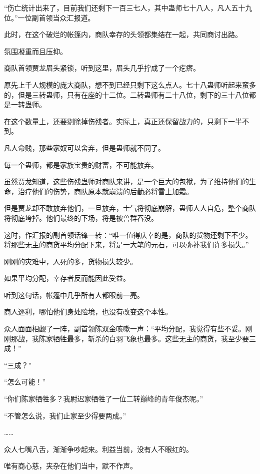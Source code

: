 
\begin{this_body}

“伤亡统计出来了，目前我们还剩下一百三七人，其中蛊师七十八人，凡人五十九位。”一位副首领当众汇报道。

此时，在这个破烂的帐篷内，商队幸存的头领都集结在一起，共同商讨出路。

氛围凝重而且压抑。

商队首领贾龙眉头紧锁，听到这里，眉头几乎拧成了一个疙瘩。

原先上千人规模的庞大商队，想不到已经只剩下这么点人。七十八蛊师听起来蛮多的，但是三转蛊师，只有在座的十二位。二转蛊师有二十八位，剩下的三十八位都是一转蛊师。

在这个数量上，还要剔除掉伤残者。实际上，真正还保留战力的，只剩下一半不到。

凡人命贱，那些家奴可以舍弃，但是蛊师就不同了。

每一个蛊师，都是家族宝贵的财富，不可能放弃。

虽然贾龙知道，这些伤残蛊师对商队来讲，是一个巨大的包袱，为了维持他们的生命，治疗他们的伤势，商队原本就崩溃的后勤必将雪上加霜。

但是贾龙却不敢放弃他们，一旦放弃，士气将彻底崩解，蛊师人人自危，整个商队将彻底垮掉。他们最终的下场，将是被兽群吞没。

这时，作汇报的副首领话锋一转：“唯一值得庆幸的是，商队的货物还剩下不少。将那些无主的商货平均分配下来，将是一大笔的元石，可以弥补我们许多损失。”

刚刚的灾难中，人死的多，货物损失较少。

如果平均分配，幸存者反而能因此受益。

听到这句话，帐篷中几乎所有人都眼前一亮。

商人逐利，哪怕他们身处险境，也没有改变这个本性。

众人面面相觑了一阵，副首领陈双金咳嗽一声：“平均分配，我觉得有些不妥。刚刚那战，我陈家牺牲最多，斩杀的白羽飞象也最多。这些无主的商货，我至少要三成！”

“三成？”

“怎么可能！”

“你们陈家牺牲多？我尉迟家牺牲了一位二转巅峰的青年俊杰呢。”

“不管怎么说，我们止家至少得要两成。”

……

众人七嘴八舌，渐渐争吵起来。利益当前，没有人不眼红的。

唯有商心慈，夹杂在他们当中，默不作声。


\end{this_body}
